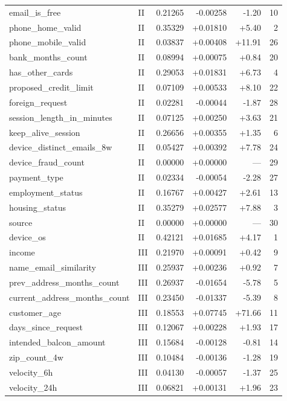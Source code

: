 \begin{longtable}{@{}llrrrr@{}}
email\_is\_free & II & 0.21265 & -0.00258 & -1.20 & 10 \\
phone\_home\_valid & II & 0.35329 & +0.01810 & +5.40 & 2 \\
phone\_mobile\_valid & II & 0.03837 & +0.00408 & +11.91 & 26 \\
bank\_months\_count & II & 0.08994 & +0.00075 & +0.84 & 20 \\
has\_other\_cards & II & 0.29053 & +0.01831 & +6.73 & 4 \\
proposed\_credit\_limit & II & 0.07109 & +0.00533 & +8.10 & 22 \\
foreign\_request & II & 0.02281 & -0.00044 & -1.87 & 28 \\
session\_length\_in\_minutes & II & 0.07125 & +0.00250 & +3.63 & 21 \\
keep\_alive\_session & II & 0.26656 & +0.00355 & +1.35 & 6 \\
device\_distinct\_emails\_8w & II & 0.05427 & +0.00392 & +7.78 & 24 \\
device\_fraud\_count & II & 0.00000 & +0.00000 & --- & 29 \\
payment\_type & II & 0.02334 & -0.00054 & -2.28 & 27 \\
employment\_status & II & 0.16767 & +0.00427 & +2.61 & 13 \\
housing\_status & II & 0.35279 & +0.02577 & +7.88 & 3 \\
source & II & 0.00000 & +0.00000 & --- & 30 \\
device\_os & II & 0.42121 & +0.01685 & +4.17 & 1 \\
income & III & 0.21970 & +0.00091 & +0.42 & 9 \\
name\_email\_similarity & III & 0.25937 & +0.00236 & +0.92 & 7 \\
prev\_address\_months\_count & III & 0.26937 & -0.01654 & -5.78 & 5 \\
current\_address\_months\_count & III & 0.23450 & -0.01337 & -5.39 & 8 \\
customer\_age & III & 0.18553 & +0.07745 & +71.66 & 11 \\
days\_since\_request & III & 0.12067 & +0.00228 & +1.93 & 17 \\
intended\_balcon\_amount & III & 0.15684 & -0.00128 & -0.81 & 14 \\
zip\_count\_4w & III & 0.10484 & -0.00136 & -1.28 & 19 \\
velocity\_6h & III & 0.04130 & -0.00057 & -1.37 & 25 \\
velocity\_24h & III & 0.06821 & +0.00131 & +1.96 & 23 \\

\end{longtable}
